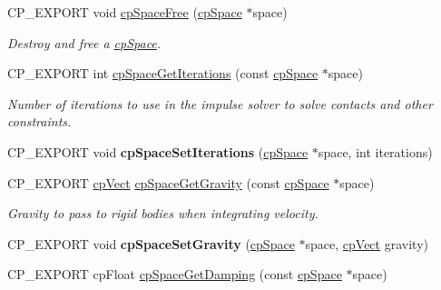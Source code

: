 \begin{DoxyCompactItemize}
\mbox{\label{group__cpSpace_gab1bc162df996c03493be80d8220e5c8a}} 
C\+P\+\_\+\+E\+X\+P\+O\+RT void \hyperlink{group__cpSpace_gab1bc162df996c03493be80d8220e5c8a}{cp\+Space\+Free} (\hyperlink{structcpSpace}{cp\+Space} $\ast$space)
\begin{DoxyCompactList}\small\item\em Destroy and free a \hyperlink{structcpSpace}{cp\+Space}. \end{DoxyCompactList}\item 
\mbox{\label{group__cpSpace_ga7e1bd8b3f1090018f65f8b798c99df79}} 
C\+P\+\_\+\+E\+X\+P\+O\+RT int \hyperlink{group__cpSpace_ga7e1bd8b3f1090018f65f8b798c99df79}{cp\+Space\+Get\+Iterations} (const \hyperlink{structcpSpace}{cp\+Space} $\ast$space)
\begin{DoxyCompactList}\small\item\em Number of iterations to use in the impulse solver to solve contacts and other constraints. \end{DoxyCompactList}\item 
\mbox{\label{group__cpSpace_ga8975460871b3e9d3a6d89a4339742ea3}} 
C\+P\+\_\+\+E\+X\+P\+O\+RT void {\bfseries cp\+Space\+Set\+Iterations} (\hyperlink{structcpSpace}{cp\+Space} $\ast$space, int iterations)
\item 
\mbox{\label{group__cpSpace_ga6270c6c036bcdd6adaeb59aac7bf6549}} 
C\+P\+\_\+\+E\+X\+P\+O\+RT \hyperlink{structcpVect}{cp\+Vect} \hyperlink{group__cpSpace_ga6270c6c036bcdd6adaeb59aac7bf6549}{cp\+Space\+Get\+Gravity} (const \hyperlink{structcpSpace}{cp\+Space} $\ast$space)
\begin{DoxyCompactList}\small\item\em Gravity to pass to rigid bodies when integrating velocity. \end{DoxyCompactList}\item 
\mbox{\label{group__cpSpace_ga5ed619ffc8d4f3405316a6646d1e751c}} 
C\+P\+\_\+\+E\+X\+P\+O\+RT void {\bfseries cp\+Space\+Set\+Gravity} (\hyperlink{structcpSpace}{cp\+Space} $\ast$space, \hyperlink{structcpVect}{cp\+Vect} gravity)
\item 
C\+P\+\_\+\+E\+X\+P\+O\+RT cp\+Float \hyperlink{group__cpSpace_gac00ad0e4956e444fa23874fae68df3b7}{cp\+Space\+Get\+Damping} (const \hyperlink{structcpSpace}{cp\+Space} $\ast$space)

\end{DoxyCompactItemize}
